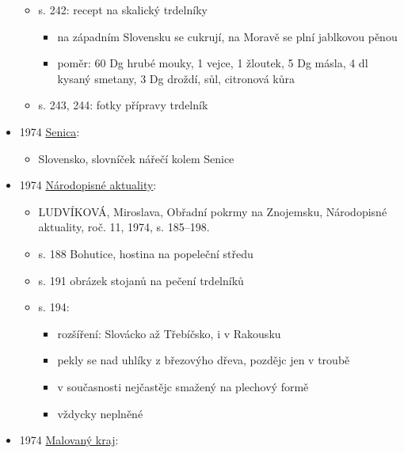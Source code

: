\begin{itemize}
  \begin{itemize}
  \tightlist
  \item
    s. 242: recept na skalický trdelníky

    \begin{itemize}
    \tightlist
    \item
      na západním Slovensku se cukrují, na Moravě se plní jablkovou
      pěnou
    \item
      poměr: 60 Dg hrubé mouky, 1 vejce, 1 žloutek, 5 Dg másla, 4 dl
      kysaný smetany, 3 Dg droždí, sůl, citronová kůra
    \end{itemize}
  \item
    s. 243, 244: fotky přípravy trdelník
  \end{itemize}
\item
  1974
  \href{https://dikda.snk.sk/uuid/uuid:d94332c2-6255-4120-ae75-24a5112dd9b9}{Senica}:

  \begin{itemize}
  \tightlist
  \item
    Slovensko, slovníček nářečí kolem Senice
  \end{itemize}
\item
  1974
  \href{https://ceskadigitalniknihovna.cz/uuid/uuid:7c79b650-3b72-11e5-b57a-005056825209}{Národopisné
  aktuality}:

  \begin{itemize}
  \tightlist
  \item
    LUDVÍKOVÁ, Miroslava, Obřadní pokrmy na Znojemsku, Národopisné
    aktuality, roč. 11, 1974, s. 185--198.
  \item
    s. 188 Bohutice, hostina na popeleční středu
  \item
    s. 191 obrázek stojanů na pečení trdelníků
  \item
    s. 194:

    \begin{itemize}
    \tightlist
    \item
      rozšíření: Slovácko až Třebíčsko, i v Rakousku
    \item
      pekly se nad uhlíky z březovýho dřeva, pozdějc jen v troubě
    \item
      v současnosti nejčastějc smažený na plechový formě
    \item
      vždycky neplněné
    \end{itemize}
  \end{itemize}
\item
  1974
  \href{https://ndk.cz/uuid/uuid:630185b0-f30f-11e3-a012-005056825209}{Malovaný
  kraj}:


\end{itemize}
